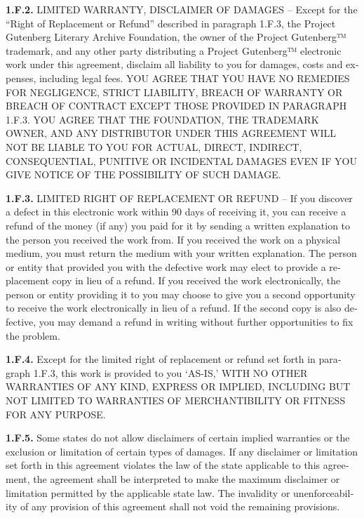 \documentclass[a5paper]{book}
\begin{document}
\begin{german}
\begin{english}
\begin{pgfooter_env}
{\bfseries{1.F.2.}} LIMITED WARRANTY, DISCLAIMER OF DAMAGES – Except for the
“Right of Replacement or Refund” described in paragraph 1.F.3, the
Project Gutenberg Literary Archive Foundation, the owner of the
Project Gutenberg™ trademark, and any other party distributing a
Project Gutenberg™ electronic work under this agreement, disclaim all
liability to you for damages, costs and expenses, including legal
fees. YOU AGREE THAT YOU HAVE NO REMEDIES FOR NEGLIGENCE, STRICT
LIABILITY, BREACH OF WARRANTY OR BREACH OF CONTRACT EXCEPT THOSE
PROVIDED IN PARAGRAPH 1.F.3. YOU AGREE THAT THE FOUNDATION, THE
TRADEMARK OWNER, AND ANY DISTRIBUTOR UNDER THIS AGREEMENT WILL NOT BE
LIABLE TO YOU FOR ACTUAL, DIRECT, INDIRECT, CONSEQUENTIAL, PUNITIVE OR
INCIDENTAL DAMAGES EVEN IF YOU GIVE NOTICE OF THE POSSIBILITY OF SUCH
DAMAGE.\par

{\bfseries{1.F.3.}} LIMITED RIGHT OF REPLACEMENT OR REFUND – If you discover a
defect in this electronic work within 90 days of receiving it, you can
receive a refund of the money (if any) you paid for it by sending a
written explanation to the person you received the work from. If you
received the work on a physical medium, you must return the medium
with your written explanation. The person or entity that provided you
with the defective work may elect to provide a replacement copy in
lieu of a refund. If you received the work electronically, the person
or entity providing it to you may choose to give you a second
opportunity to receive the work electronically in lieu of a refund. If
the second copy is also defective, you may demand a refund in writing
without further opportunities to fix the problem.\par

{\bfseries{1.F.4.}} Except for the limited right of replacement or refund set
forth in paragraph 1.F.3, this work is provided to you ‘AS-IS,’ WITH
NO OTHER WARRANTIES OF ANY KIND, EXPRESS OR IMPLIED, INCLUDING BUT NOT
LIMITED TO WARRANTIES OF MERCHANTIBILITY OR FITNESS FOR ANY PURPOSE.\par

{\bfseries{1.F.5.}} Some states do not allow disclaimers of certain implied
warranties or the exclusion or limitation of certain types of
damages. If any disclaimer or limitation set forth in this agreement
violates the law of the state applicable to this agreement, the
agreement shall be interpreted to make the maximum disclaimer or
limitation permitted by the applicable state law. The invalidity or
unenforceability of any provision of this agreement shall not void the
remaining provisions.\par


\end{pgfooter_env}
\end{english}
\end{german}
\end{document}
